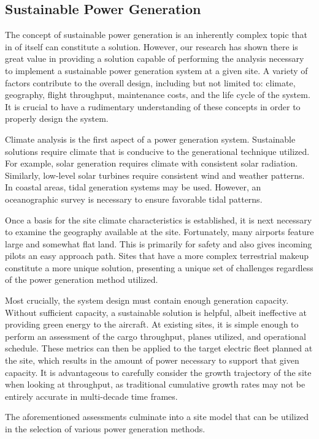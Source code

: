 \documentclass[../main.tex]{subfiles}
\begin{document}
\subsection{Sustainable Power Generation} %
The concept of sustainable power generation is an inherently complex topic that in of itself can constitute a solution. However, our research has shown there is great value in providing a solution capable of performing the analysis necessary to implement a sustainable power generation system at a given site. A variety of factors contribute to the overall design, including but not limited to: climate, geography, flight throughput, maintenance costs, and the life cycle of the system. It is crucial to have a rudimentary understanding of these concepts in order to properly design the system.\par
Climate analysis is the first aspect of a power generation system. Sustainable solutions require climate that is conducive to the generational technique utilized. For example, solar generation requires climate with consistent solar radiation. Similarly, low-level solar turbines require consistent wind and weather patterns. In coastal areas, tidal generation systems may be used. However, an oceanographic survey is necessary to ensure favorable tidal patterns.\par
Once a basis for the site climate characteristics is established, it is next necessary to examine the geography available at the site. Fortunately, many airports feature large and somewhat flat land. This is primarily for safety and also gives incoming pilots an easy approach path. Sites that have a more complex terrestrial makeup constitute a more unique solution, presenting a unique set of challenges regardless of the power generation method utilized.\par
Most crucially, the system design must contain enough generation capacity. Without sufficient capacity, a sustainable solution is helpful, albeit ineffective at providing green energy to the aircraft. At existing sites, it is simple enough to perform an assessment of the cargo throughput, planes utilized, and operational schedule. These metrics can then be applied to the target electric fleet planned at the site, which results in the amount of power necessary to support that given capacity. It is advantageous to carefully consider the growth trajectory of the site when looking at throughput, as traditional cumulative growth rates may not be entirely accurate in multi-decade time frames.\par
The aforementioned assessments culminate into a site model that can be utilized in the selection of various power generation methods.
\newpage
\end{document}
